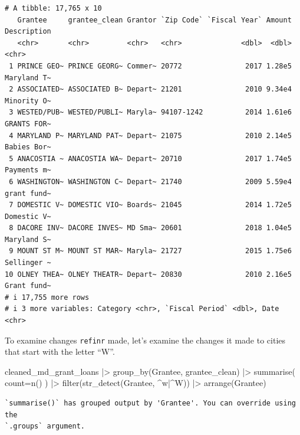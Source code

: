 \documentclass[
  letterpaper,
  DIV=11,
  numbers=noendperiod]{scrreprt}
\newenvironment{Shaded}{\begin{snugshade}}{\end{snugshade}}
\newcommand{\AttributeTok}[1]{\textcolor[rgb]{0.40,0.45,0.13}{#1}}
\newcommand{\FunctionTok}[1]{\textcolor[rgb]{0.28,0.35,0.67}{#1}}
\newcommand{\NormalTok}[1]{\textcolor[rgb]{0.00,0.23,0.31}{#1}}
\newcommand{\SpecialCharTok}[1]{\textcolor[rgb]{0.37,0.37,0.37}{#1}}
\newcommand{\StringTok}[1]{\textcolor[rgb]{0.13,0.47,0.30}{#1}}
\begin{document}
\begin{verbatim}
# A tibble: 17,765 x 10
   Grantee     grantee_clean Grantor `Zip Code` `Fiscal Year` Amount Description
   <chr>       <chr>         <chr>   <chr>              <dbl>  <dbl> <chr>      
 1 PRINCE GEO~ PRINCE GEORG~ Commer~ 20772               2017 1.28e5 Maryland T~
 2 ASSOCIATED~ ASSOCIATED B~ Depart~ 21201               2010 9.34e4 Minority O~
 3 WESTED/PUB~ WESTED/PUBLI~ Maryla~ 94107-1242          2014 1.61e6 GRANTS FOR~
 4 MARYLAND P~ MARYLAND PAT~ Depart~ 21075               2010 2.14e5 Babies Bor~
 5 ANACOSTIA ~ ANACOSTIA WA~ Depart~ 20710               2017 1.74e5 Payments m~
 6 WASHINGTON~ WASHINGTON C~ Depart~ 21740               2009 5.59e4 grant fund~
 7 DOMESTIC V~ DOMESTIC VIO~ Boards~ 21045               2014 1.72e5 Domestic V~
 8 DACORE INV~ DACORE INVES~ MD Sma~ 20601               2018 1.04e5 Maryland S~
 9 MOUNT ST M~ MOUNT ST MAR~ Maryla~ 21727               2015 1.75e6 Sellinger ~
10 OLNEY THEA~ OLNEY THEATR~ Depart~ 20830               2010 2.16e5 Grant fund~
# i 17,755 more rows
# i 3 more variables: Category <chr>, `Fiscal Period` <dbl>, Date <chr>
\end{verbatim}

To examine changes \texttt{refinr} made, let's examine the changes it
made to cities that start with the letter ``W''.

\begin{Shaded}
\begin{Highlighting}[]
\NormalTok{cleaned\_md\_grant\_loans }\SpecialCharTok{|\textgreater{}}
  \FunctionTok{group\_by}\NormalTok{(Grantee, grantee\_clean) }\SpecialCharTok{|\textgreater{}}
  \FunctionTok{summarise}\NormalTok{(}
    \AttributeTok{count=}\FunctionTok{n}\NormalTok{()}
\NormalTok{  ) }\SpecialCharTok{|\textgreater{}}
  \FunctionTok{filter}\NormalTok{(}\FunctionTok{str\_detect}\NormalTok{(Grantee, }\StringTok{\textquotesingle{}\^{}w|\^{}W\textquotesingle{}}\NormalTok{)) }\SpecialCharTok{|\textgreater{}}
  \FunctionTok{arrange}\NormalTok{(Grantee)}
\end{Highlighting}
\end{Shaded}

\begin{verbatim}
`summarise()` has grouped output by 'Grantee'. You can override using the
`.groups` argument.
\end{verbatim}
\end{document}
